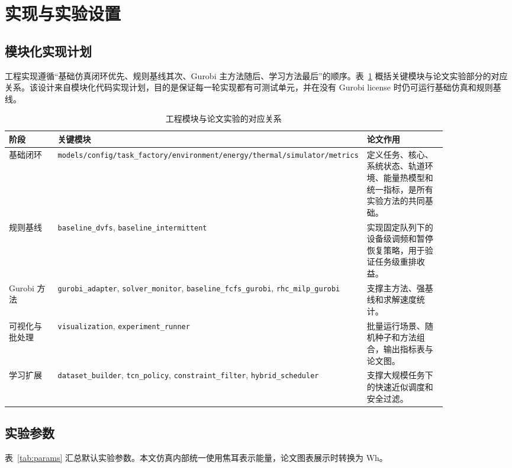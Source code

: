 \section{实现与实验设置}

\subsection{模块化实现计划}

工程实现遵循“基础仿真闭环优先、规则基线其次、Gurobi 主方法随后、学习方法最后”的顺序。表~\ref{tab:module-plan} 概括关键模块与论文实验部分的对应关系。该设计来自模块化代码实现计划，目的是保证每一轮实现都有可测试单元，并在没有 Gurobi license 时仍可运行基础仿真和规则基线。

\begin{table}[t]
\centering
\caption{工程模块与论文实验的对应关系}
\label{tab:module-plan}
\begin{tabular}{p{0.18\linewidth}p{0.25\linewidth}p{0.43\linewidth}}
\toprule
阶段 & 关键模块 & 论文作用 \\
\midrule
基础闭环 & \texttt{models/config/task\_factory/environment/energy/thermal/simulator/metrics} & 定义任务、核心、系统状态、轨道环境、能量热模型和统一指标，是所有实验方法的共同基础。 \\
规则基线 & \texttt{baseline\_dvfs}, \texttt{baseline\_intermittent} & 实现固定队列下的设备级调频和暂停恢复策略，用于验证任务级重排收益。 \\
Gurobi 方法 & \texttt{gurobi\_adapter}, \texttt{solver\_monitor}, \texttt{baseline\_fcfs\_gurobi}, \texttt{rhc\_milp\_gurobi} & 支撑主方法、强基线和求解速度统计。 \\
可视化与批处理 & \texttt{visualization}, \texttt{experiment\_runner} & 批量运行场景、随机种子和方法组合，输出指标表与论文图。 \\
学习扩展 & \texttt{dataset\_builder}, \texttt{tcn\_policy}, \texttt{constraint\_filter}, \texttt{hybrid\_scheduler} & 支撑大规模任务下的快速近似调度和安全过滤。 \\
\bottomrule
\end{tabular}
\end{table}

\subsection{实验参数}

表~\ref{tab:params} 汇总默认实验参数。本文仿真内部统一使用焦耳表示能量，论文图表展示时转换为 Wh。

